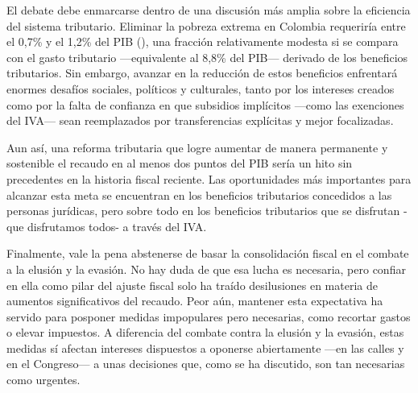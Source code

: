 El debate debe enmarcarse dentro de una discusión más amplia sobre la eficiencia del sistema tributario. Eliminar la pobreza extrema en Colombia requeriría entre el 0,7\% y el 1,2\% del PIB (\cite{Ofiscal2025pob}), una fracción relativamente modesta si se compara con el gasto tributario —equivalente al 8,8\% del PIB— derivado de los beneficios tributarios. Sin embargo, avanzar en la reducción de estos beneficios enfrentará enormes desafíos sociales, políticos y culturales, tanto por los intereses creados como por la falta de confianza en que subsidios implícitos —como las exenciones del IVA— sean reemplazados por transferencias explícitas y mejor focalizadas.

Aun así, una reforma tributaria que logre aumentar de manera permanente y sostenible el recaudo en al menos dos puntos del PIB sería un hito sin precedentes en la historia fiscal reciente.  Las oportunidades más importantes para alcanzar esta meta se encuentran en los beneficios tributarios concedidos a las personas jurídicas, pero sobre todo en los beneficios tributarios que se disfrutan -que disfrutamos todos- a través del IVA.

Finalmente, vale la pena abstenerse de basar la consolidación fiscal en el combate a la elusión y la evasión. No hay duda de que esa lucha es necesaria, pero confiar en ella como pilar del ajuste fiscal solo ha traído desilusiones en materia de aumentos significativos del recaudo. Peor aún, mantener esta expectativa ha servido para posponer medidas impopulares pero necesarias, como recortar gastos o elevar impuestos. A diferencia del combate contra la elusión y la evasión, estas medidas sí afectan intereses dispuestos a oponerse abiertamente —en las calles y en el Congreso— a unas decisiones que, como se ha discutido, son tan necesarias como urgentes.